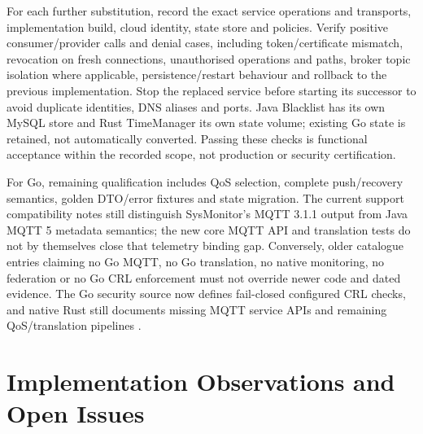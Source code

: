 \documentclass[a4paper]{arrowhead}
\begin{document}
For each further substitution, record the exact service operations and transports,
implementation build, cloud identity, state store and policies. Verify positive
consumer/provider calls and denial cases, including token/certificate mismatch,
revocation on fresh connections, unauthorised operations and paths, broker topic
isolation where applicable, persistence/restart behaviour and rollback to the
previous implementation. Stop the replaced service before starting its successor
to avoid duplicate identities, DNS aliases and ports. Java Blacklist has its own
MySQL store and Rust TimeManager its own state volume; existing Go state is
retained, not automatically converted. Passing these checks is functional
acceptance within the recorded scope, not production or security certification.

For Go, remaining qualification includes QoS selection, complete push/recovery
semantics, golden DTO/error fixtures and state migration. The current support
compatibility notes still distinguish SysMonitor's MQTT 3.1.1 output from Java
MQTT 5 metadata semantics; the new core MQTT API and translation tests do not by
themselves close that telemetry binding gap. Conversely, older catalogue entries
claiming no Go MQTT, no Go translation, no native monitoring, no federation or
no Go CRL enforcement must not override newer code and dated evidence. The Go
security source now defines fail-closed configured CRL checks, and native Rust
still documents missing MQTT service APIs and remaining QoS/translation pipelines
\cite{nativeCompatibility20261024,goMqtt20261024,rustFederation20261019}.

\section{Implementation Observations and Open Issues}
\label{sec:issues}
\end{document}
